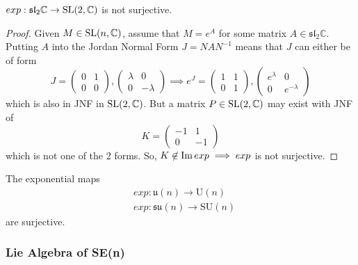   \begin{theorem}
    $exp: \mathfrak{sl}_2 \mathbb{C} \rightarrow \operatorname{SL}(2, \mathbb{C})$ is not surjective. 
  \end{theorem}
  \begin{proof}
    Given $M \in \operatorname{SL}(n, \mathbb{C})$, assume that $M = e^A$ for some matrix $A \in \mathfrak{sl}_2 \mathbb{C}$. Putting $A$ into the Jordan Normal Form $J = N A N^{-1}$ means that $J$ can either be of form
    \begin{equation}
      J = \begin{pmatrix}
      0&1\\0&0
      \end{pmatrix}, \begin{pmatrix}
      \lambda&0\\0&-\lambda
      \end{pmatrix} \implies e^J = \begin{pmatrix}
      1&1\\0&1
      \end{pmatrix}, \begin{pmatrix}
      e^\lambda&0\\0&e^{-\lambda}
      \end{pmatrix}
    \end{equation}
    which is also in JNF in $\operatorname{SL}(2, \mathbb{C})$. But a matrix $P \in \operatorname{SL}(2, \mathbb{C})$ may exist with JNF of 
    \begin{equation}
      K = \begin{pmatrix}
      -1&1\\0&-1
      \end{pmatrix}
    \end{equation}
    which is not one of the 2 forms. So, $K \not\in \operatorname{Im}{exp} \implies exp$ is not surjective. 
  \end{proof}

  \begin{theorem}
  The exponential maps 
  \begin{align*}
    & exp: \mathfrak{u}(n) \rightarrow \text{U}(n) \\
    & exp: \mathfrak{su}(n) \rightarrow \text{SU}(n)
  \end{align*}
  are surjective. 
  \end{theorem}

\subsubsection{Lie Algebra of SE(n)}

